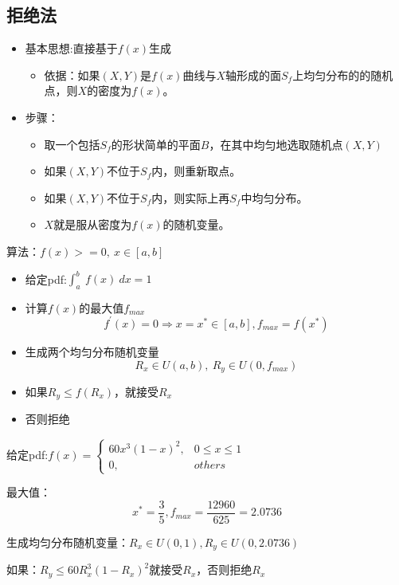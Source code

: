 \subsection{拒绝法}
\begin{newprop}
    \begin{itemize}
        \item 基本思想:\textcolor{thid2}{直接基于$f(x)$生成}
        \begin{itemize}
            \item 依据：如果$(X,Y)$是\textcolor{thid1}{$f(x)$曲线与$X$轴形成的面$S_{f}$}上均匀分布的的随机点，则\textcolor{thid1}{$X$的密度为$f(x)$}。
        \end{itemize}
        \item 步骤：
        \begin{itemize}
            \item 取一个\textcolor{thid2}{包括$S_{f}$的形状简单的平面$B$}，在其中均匀地选取随机点$(X,Y)$
            \item 如果$(X,Y)$不位于$S_{f}$内，则重新取点。
            \item 如果$(X,Y)$不位于$S_{f}$内，则实际上再$S_{f}$中均匀分布。
            \item $X$就是服从密度为$f(x)$的随机变量。
        \end{itemize}
    \end{itemize}
\end{newprop}
算法：$f(x)>=0,\ x\in[a,b]$
\begin{itemize}
    \item 给定pdf:$\int_{a}^{b}\ f(x) \ dx = 1$
    \item 计算$f(x)$的最大值$f_{max}$
    \[f^{'}(x) = 0\Rightarrow x=x^{*}\in[a,b],f_{max} = f(x^{*})\]
    \item 生成两个均匀分布随机变量
    \[R_{x}\in U(a,b),\ R_{y}\in U(0,f_{max})\]
    \item 如果$R_{y}\leqslant f(R_{x})$，就接受$R_{x}$
    \item 否则拒绝
\end{itemize}
\begin{example}
    给定pdf:$
    f(x)=
    \left\{  
    \begin{array}{lr} 
        60x^{3}(1-x)^{2},&0\leqslant x \leqslant 1 \\
        0, &others
    \end{array}  
    \right.  
    $
    
    最大值：
    \[x^{*} = \frac{3}{5},f_{max} = \frac{12960}{625} = 2.0736\]
    
    生成均匀分布随机变量：$R_{x}\in U(0,1), R_{y}\in U(0,2.0736)$
    
    如果：$R_{y}\leqslant 60R_{x}^{3}(1-R_{x})^{2}$就接受$R_{x}$，否则拒绝$R_{x}$
\end{example}

